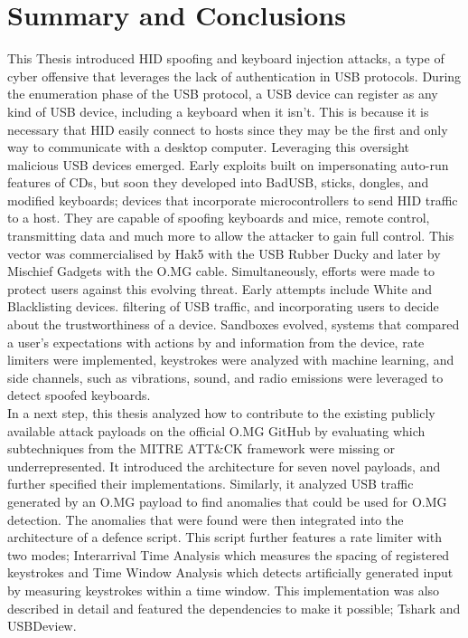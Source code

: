 \chapter{Summary and Conclusions}

This Thesis introduced HID spoofing and keyboard injection attacks, a type of cyber offensive that leverages the lack of authentication in USB protocols. During the enumeration phase of the USB protocol, a USB device can register as any kind of USB device, including a keyboard when it isn't. This is because it is necessary that HID easily connect to hosts since they may be the first and only way to communicate with a desktop computer. Leveraging this oversight malicious USB devices emerged. Early exploits built on impersonating auto-run features of CDs, but soon they developed into BadUSB, sticks, dongles, and modified keyboards; devices that incorporate microcontrollers to send HID traffic to a host. They are capable of spoofing keyboards and mice, remote control, transmitting data and much more to allow the attacker to gain full control. This vector was commercialised by Hak5 with the USB Rubber Ducky and later by Mischief Gadgets with the O.MG cable. Simultaneously, efforts were made to protect users against this evolving threat. Early attempts include White and Blacklisting devices. filtering of USB traffic, and incorporating users to decide about the trustworthiness of a device. Sandboxes evolved, systems that compared a user's expectations with actions by and information from the device, rate limiters were implemented, keystrokes were analyzed with machine learning, and side channels, such as vibrations, sound, and radio emissions were leveraged to detect spoofed keyboards. \\
In a next step, this thesis analyzed how to contribute to the existing publicly available attack payloads on the official O.MG GitHub by evaluating which subtechniques from the MITRE ATT\&CK framework were missing or underrepresented. It introduced the architecture for seven novel payloads, and further specified their implementations. Similarly, it analyzed USB traffic generated by an O.MG payload to find anomalies that could be used for O.MG detection. The anomalies that were found were then integrated into the architecture of a defence script. This script further features a rate limiter with two modes; Interarrival Time Analysis which measures the spacing of registered keystrokes and Time Window Analysis which detects artificially generated input by measuring keystrokes within a time window. This implementation was also described in detail and featured the dependencies to make it possible; Tshark and USBDeview. \\
